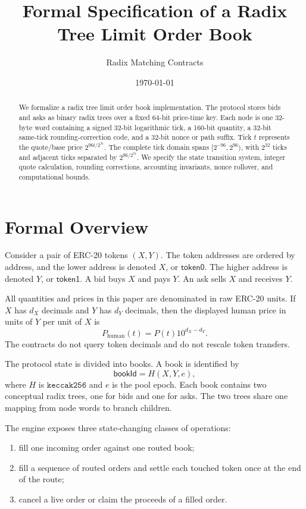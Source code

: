\documentclass[11pt]{article}
\title{Formal Specification of a Radix Tree Limit Order Book}
\author{Radix Matching Contracts}
\date{\today}
\begin{document}
\maketitle

\begin{abstract}
We formalize a radix tree limit order book implementation.  The protocol
stores bids and asks as binary radix trees over
a fixed 64-bit price-time key.  Each node is one 32-byte word containing
a signed 32-bit logarithmic tick, a 160-bit quantity, a 32-bit same-tick
rounding-correction code, and a 32-bit nonce or path suffix.  Tick \(t\)
represents the quote/base price \(2^{96t/2^{31}}\).  The complete tick
domain spans \([2^{-96},2^{96})\), with \(2^{32}\) ticks and adjacent
ticks separated by \(2^{96/2^{31}}\).  We specify the state transition
system, integer quote calculation, rounding corrections, accounting
invariants, nonce rollover, and computational bounds.
\end{abstract}

\section{Formal Overview}

Consider a pair of ERC-20 tokens \((X,Y)\).  The token addresses are
ordered by address, and the lower address is denoted \(X\), or
\(\mathsf{token0}\).  The higher address is denoted \(Y\), or
\(\mathsf{token1}\).  A bid buys \(X\) and pays \(Y\).  An ask sells
\(X\) and receives \(Y\).

All quantities and prices in this paper are denominated in raw ERC-20
units.  If \(X\) has \(d_X\) decimals and \(Y\) has \(d_Y\) decimals,
then the displayed human price in units of \(Y\) per unit of \(X\) is
\[
  P_{\mathrm{human}}(t)=P(t)10^{d_X-d_Y}.
\]
The contracts do not query token decimals and do not rescale token
transfers.

The protocol state is divided into books.  A book is identified by
\[
  \mathsf{bookId} = H(X,Y,e),
\]
where \(H\) is \(\mathtt{keccak256}\) and \(e\) is the pool epoch.  Each
book contains two conceptual radix trees, one for bids and one for asks.
The two trees share one mapping from node words to branch children.

The engine exposes three state-changing classes of operations:
\begin{enumerate}[label=(\roman*)]
  \item fill one incoming order against one routed book;
  \item fill a sequence of routed orders and settle each touched token
  once at the end of the route;
  \item cancel a live order or claim the proceeds of a filled order.
\end{enumerate}
\end{document}
